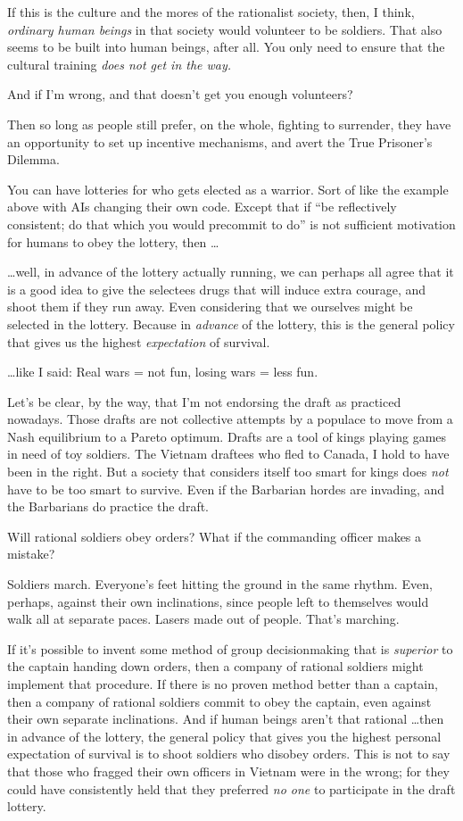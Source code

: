 {
 If this is the culture and the mores of the rationalist society,
then, I think, \textit{ordinary human beings} in that society would
volunteer to be soldiers. That also seems to be built into human
beings, after all. You only need to ensure that the cultural training
\textit{does not get in the way.}}

{
 And if I'm wrong, and that doesn't
get you enough volunteers?}

{
 Then so long as people still prefer, on the whole, fighting to
surrender, they have an opportunity to set up incentive mechanisms, and
avert the True Prisoner's Dilemma.}

{
 You can have lotteries for who gets elected as a warrior. Sort of
like the example above with AIs changing their own code. Except that if
``be reflectively consistent; do that which you would
precommit to do'' is not sufficient motivation for
humans to obey the lottery, then \ldots}

{
 \ldots well, in advance of the lottery actually running, we can
perhaps all agree that it is a good idea to give the selectees drugs
that will induce extra courage, and shoot them if they run away. Even
considering that we ourselves might be selected in the lottery. Because
in \textit{advance} of the lottery, this is the general policy that
gives us the highest \textit{expectation} of survival.}

{
 \ldots like I said: Real wars = not fun, losing wars = less fun.}

{
 Let's be clear, by the way, that
I'm not endorsing the draft as practiced nowadays.
Those drafts are not collective attempts by a populace to move from a
Nash equilibrium to a Pareto optimum. Drafts are a tool of kings
playing games in need of toy soldiers. The Vietnam draftees who fled to
Canada, I hold to have been in the right. But a society that considers
itself too smart for kings does \textit{not} have to be too smart to
survive. Even if the Barbarian hordes are invading, and the Barbarians
do practice the draft.}

{
 Will rational soldiers obey orders? What if the commanding officer
makes a mistake?}

{
 Soldiers march. Everyone's feet hitting the ground
in the same rhythm. Even, perhaps, against their own inclinations,
since people left to themselves would walk all at separate paces.
Lasers made out of people. That's marching.}

{
 If it's possible to invent some method of group
decisionmaking that is \textit{superior} to the captain handing down
orders, then a company of rational soldiers might implement that
procedure. If there is no proven method better than a captain, then a
company of rational soldiers commit to obey the captain, even against
their own separate inclinations. And if human beings
aren't that rational \ldots then in advance of the
lottery, the general policy that gives you the highest personal
expectation of survival is to shoot soldiers who disobey orders. This
is not to say that those who fragged their own officers in Vietnam were
in the wrong; for they could have consistently held that they preferred
\textit{no one} to participate in the draft lottery.}

